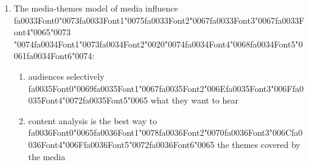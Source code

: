 \documentclass[12pt]{article}
\begin{document}
\begin{enumerate}[label=\arabic*.]
\begin{enumerate}[label=(\alph*)]
    \item boys being {\csname fa0025Font0\endcsname\char"0064}{\csname fa0025Font1\endcsname\char"0069}{\csname fa0025Font2\endcsname\char"0073}{\csname fa0025Font3\endcsname\char"0074}{\csname fa0025Font4\endcsname\char"0061}{\csname fa0025Font5\endcsname\char"006E} {\char"0074}{\csname fa0026Font1\endcsname\char"0020}{\csname fa0026Font2\endcsname\char"0066}{\csname fa0026Font3\endcsname\char"0072}{\csname fa0026Font4\endcsname\char"006F}{\csname fa0026Font5\endcsname\char"006D} {\csname fa0027Font0\endcsname\char"0020}{\csname fa0027Font1\endcsname\char"0074}{\csname fa0027Font2\endcsname\char"0068}{\csname fa0027Font3\endcsname\char"0065}{\csname fa0027Font4\endcsname\char"0069}{\csname fa0027Font5\endcsname\char"0072}{\csname fa0027Font6\endcsname\char"0020} {\char"0066}{\char"0061}{\char"0074}{\char"0068}{\char"0065}{\char"0072}{\char"0073} and girls to their mothers
    \item {\csname fa0029Font0\endcsname\char"006F}{\csname fa0029Font1\endcsname\char"006E} {\csname fa0030Font0\endcsname\char"006C}{\csname fa0030Font1\endcsname\char"0079} {\csname fa0031Font0\endcsname\char"0020}{\csname fa0031Font1\endcsname\char"0067}{\csname fa0031Font2\endcsname\char"0069} {\csname fa0032Font0\endcsname\char"0072}{\csname fa0032Font1\endcsname\char"006C}{\char"0073} being closely attached to their fathers, but girls breaking away
\end{enumerate}
\item The media-themes model of media influence {\csname fa0033Font0\endcsname\char"0073}{\csname fa0033Font1\endcsname\char"0075}{\csname fa0033Font2\endcsname\char"0067}{\csname fa0033Font3\endcsname\char"0067}{\csname fa0033Font4\endcsname\char"0065}{\char"0073} {\char"0074}{\csname fa0034Font1\endcsname\char"0073}{\csname fa0034Font2\endcsname\char"0020}{\char"0074}{\csname fa0034Font4\endcsname\char"0068}{\csname fa0034Font5\endcsname\char"0061}{\csname fa0034Font6\endcsname\char"0074}:
\begin{enumerate}[label=(\alph*)]
    \item audiences selectively {\csname fa0035Font0\endcsname\char"0069}{\csname fa0035Font1\endcsname\char"0067}{\csname fa0035Font2\endcsname\char"006E}{\csname fa0035Font3\endcsname\char"006F}{\csname fa0035Font4\endcsname\char"0072}{\csname fa0035Font5\endcsname\char"0065} what they want to hear
    \item content analysis is the best way to {\csname fa0036Font0\endcsname\char"0065}{\csname fa0036Font1\endcsname\char"0078}{\csname fa0036Font2\endcsname\char"0070}{\csname fa0036Font3\endcsname\char"006C}{\csname fa0036Font4\endcsname\char"006F}{\csname fa0036Font5\endcsname\char"0072}{\csname fa0036Font6\endcsname\char"0065} the themes covered by the media

\end{enumerate}
\end{enumerate}
\end{document}
